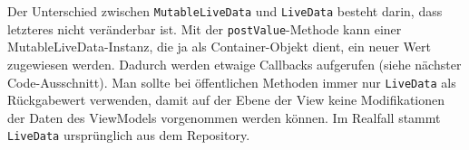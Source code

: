 \begin{Shaded}
\begin{Highlighting}[]
 


    \NormalTok{> }\NormalTok{() \{}
        \NormalTok{) \{}
\NormalTok{        \}}
\NormalTok{(}\NormalTok{);}

\NormalTok{    \}}

\NormalTok{\}}
\end{Highlighting}
\end{Shaded}

Der Unterschied zwischen \texttt{MutableLiveData} und \texttt{LiveData}
besteht darin, dass letzteres nicht veränderbar ist. Mit der
\texttt{postValue}-Methode kann einer MutableLiveData-Instanz, die ja
als Container-Objekt dient, ein neuer Wert zugewiesen werden. Dadurch
werden etwaige Callbacks aufgerufen (siehe nächster Code-Ausschnitt).
Man sollte bei öffentlichen Methoden immer nur \texttt{LiveData} als
Rückgabewert verwenden, damit auf der Ebene der View keine
Modifikationen der Daten des ViewModels vorgenommen werden können. Im
Realfall stammt \texttt{LiveData} ursprünglich aus dem Repository.


